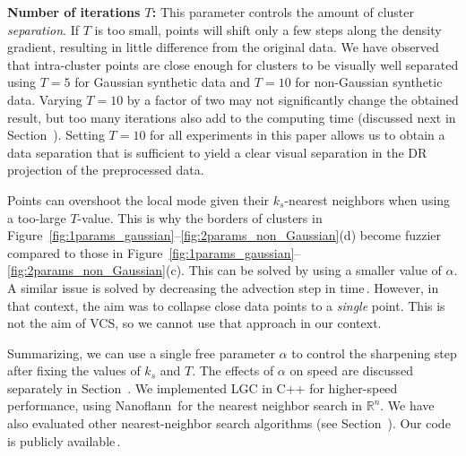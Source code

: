 \documentclass[sagev,Afour,times]{sagej}
\begin{document}
\noindent\textbf{Number of iterations $T$:} This parameter controls the amount of cluster \emph{separation}. If $T$ is too small, points will shift only a few steps along the density gradient, resulting in little difference from the original data. We have observed that intra-cluster points are close enough for clusters to be visually well separated using $T=5$ for Gaussian synthetic data and $T=10$ for non-Gaussian synthetic data. Varying $T=10$ by a factor of two may not significantly change the obtained result, but too many iterations also add to the computing time (discussed next in Section~). Setting $T=10$ for all experiments in this paper allows us to obtain a data separation that is sufficient to yield a clear visual separation in the DR projection of the preprocessed data. 

Points can overshoot the local mode given their $k_s$-nearest neighbors when using a too-large $T$-value. This is why the borders of clusters in Figure~\ref{fig:1params_gaussian}--\ref{fig:2params_non_Gaussian}(d) become fuzzier compared to those in Figure~\ref{fig:1params_gaussian}--\ref{fig:2params_non_Gaussian}(c). This can be solved by using a smaller value of $\alpha$. A similar issue is solved by decreasing the advection step in time\,\cite{alex1}. However, in that context, the aim was to collapse close data points to a \emph{single} point. This is not the aim of VCS, so we cannot use that approach in our context.

\par Summarizing, we can use a single free parameter $\alpha$ to control the sharpening step after fixing the values of $k_s$ and $T$. The effects of $\alpha$ on speed are discussed separately in Section~. We implemented LGC in C++ for higher-speed performance, using Nanoflann\,\cite{flann_2009,flann_2014,nanoflann} for the nearest neighbor search in $\mathbb{R}^n$. We have also evaluated other nearest-neighbor search algorithms (see Section~). Our code is publicly available\,\cite{hd-sdr}.

\end{document}
